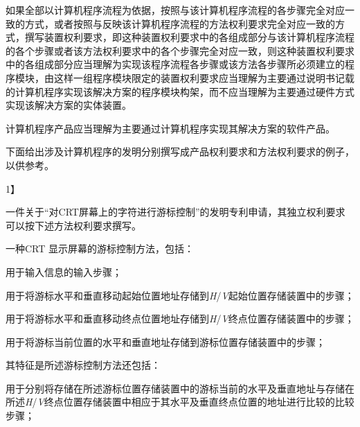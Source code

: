 {\setlength{\parindent}{20.6bp}如果全部以计算机程序流程为依据，按照与该计算机程序流程的各步骤完全对应一致的方式，或者按照与反映该计算机程序流程的方法权利要求完全对应一致的方式，撰写装置权利要求，即这种装置权利要求中的各组成部分与该计算机程序流程的各个步骤或者该方法权利要求中的各个步骤完全对应一致，则这种装置权利要求中的各组成部分应当理解为实现该程序流程各步骤或该方法各步骤所必须建立的程序模块，由这样一组程序模块限定的装置权利要求应当理解为主要通过说明书记载的计算机程序实现该解决方案的程序模块构架，而不应当理解为主要通过硬件方式实现该解决方案的实体装置。\par}

{\setlength{\parindent}{20.6bp}计算机程序产品应当理解为主要通过计算机程序实现其解决方案的软件产品。\par}

{\setlength{\parindent}{20.6bp}下面给出涉及计算机程序的发明分别撰写成产品权利要求和方法权利要求的例子，以供参考。\par}

{1】\par}

{\setlength{\parindent}{20.6bp}一件关于“对CRT屏幕上的字符进行游标控制”的发明专利申请，其独立权利要求可以按下述方法权利要求撰写。\par}

{\setlength{\parindent}{20.6bp}一种CRT 显示屏幕的游标控制方法，包括：\par}

{\setlength{\parindent}{20.6bp}用于输入信息的输入步骤；\par}

{\setlength{\parindent}{20.6bp}用于将游标水平和垂直移动起始位置地址存储到\textit{H}/\textit{V}起始位置存储装置中的步骤；\par}

{\setlength{\parindent}{20.6bp}用于将游标水平和垂直移动终点位置地址存储到\textit{H}/\textit{V}终点位置存储装置中的步骤；\par}

{\setlength{\parindent}{20.6bp}用于将游标当前位置的水平和垂直地址存储到游标位置存储装置中的步骤；\par}

{\setlength{\parindent}{20.6bp}其特征是所述游标控制方法还包括：\par}

{\setlength{\parindent}{20.6bp}用于分别将存储在所述游标位置存储装置中的游标当前的水平及垂直地址与存储在所述\textit{H}/\textit{V}终点位置存储装置中相应于其水平及垂直终点位置的地址进行比较的比较步骤；\par}

